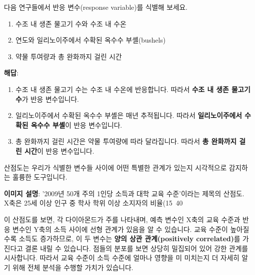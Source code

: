 \documentclass[11pt,a4paper]{book}
\theoremstyle{definition}
\begin{document}
\begin{tcolorbox}[examplebox, title={연습: 반응 변수 선택하기}]
다음 연구들에서 반응 변수(response variable)를 식별해 보세요.

\begin{enumerate}[label=\arabic*.]
    \item 수조 내 생존 물고기 수와 수조 내 수온
    \item 연도와 일리노이주에서 수확된 옥수수 부셸(bushels)
    \item 약물 투여량과 총 완화까지 걸린 시간
\end{enumerate}

\textbf{해답}:
\begin{enumerate}[label=\arabic*.]
    \item 수조 내 생존 물고기 수는 수조 내 수온에 반응합니다. 따라서 \textbf{수조 내 생존 물고기 수}가 반응 변수입니다.
    \item 일리노이주에서 수확된 옥수수 부셸은 매년 추적됩니다. 따라서 \textbf{일리노이주에서 수확된 옥수수 부셸}이 반응 변수입니다.
    \item 총 완화까지 걸린 시간은 약물 투여량에 따라 달라집니다. 따라서 \textbf{총 완화까지 걸린 시간}이 반응 변수입니다.
\end{enumerate}
\end{tcolorbox}

\begin{tcolorbox}[infobox, title={산점도 (Scatter Plots)}]
산점도는 우리가 식별한 변수들 사이에 어떤 특별한 관계가 있는지 시각적으로 감지하는 훌륭한 도구입니다.

\begin{center}
\end{center}
\textbf{이미지 설명}: '2009년 50개 주의 1인당 소득과 대학 교육 수준'이라는 제목의 산점도. X축은 25세 이상 인구 중 학사 학위 이상 소지자의 비율(15~40%

이 산점도를 보면, 각 다이아몬드가 주를 나타내며, 예측 변수인 X축의 교육 수준과 반응 변수인 Y축의 소득 사이에 선형 관계가 있음을 알 수 있습니다. 교육 수준이 높아질수록 소득도 증가하므로, 이 두 변수는 \textbf{양의 상관 관계(positively correlated)}를 가진다고 결론 내릴 수 있습니다. 점들의 분포를 보면 상당히 밀집되어 있어 강한 관계를 시사합니다. 따라서 교육 수준이 소득 수준에 얼마나 영향을 미 미치는지 더 자세히 알기 위해 전체 분석을 수행할 가치가 있습니다.
\end{tcolorbox}
\end{document}
